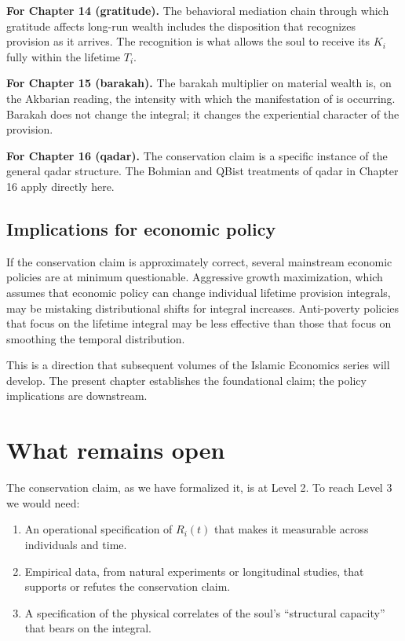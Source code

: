 \textbf{For Chapter 14 (gratitude).} The behavioral mediation chain
through which gratitude affects long-run wealth includes the
disposition that recognizes provision as it arrives. The
recognition is what allows the soul to receive its $K_i$ fully
within the lifetime $T_i$.

\textbf{For Chapter 15 (barakah).} The barakah multiplier on
material wealth is, on the Akbarian reading, the intensity with
which the manifestation of  is occurring. Barakah
does not change the integral; it changes the experiential
character of the provision.

\textbf{For Chapter 16 (qadar).} The conservation claim is a
specific instance of the general qadar structure. The Bohmian and
QBist treatments of qadar in Chapter 16 apply directly here.

\subsection{Implications for economic policy}

If the conservation claim is approximately correct, several
mainstream economic policies are at minimum questionable.
Aggressive growth maximization, which assumes that economic policy
can change individual lifetime provision integrals, may be
mistaking distributional shifts for integral increases.
Anti-poverty policies that focus on the lifetime integral may be
less effective than those that focus on smoothing the temporal
distribution.

This is a direction that subsequent volumes of the Islamic
Economics series will develop. The present chapter establishes the
foundational claim; the policy implications are downstream.

\section{What remains open}
\label{sec:rizq-open}

The conservation claim, as we have formalized it, is at Level 2. To
reach Level 3 we would need:

\begin{enumerate}[leftmargin=2em]
    \item An operational specification of $R_i(t)$ that makes it
    measurable across individuals and time.
    \item Empirical data, from natural experiments or longitudinal
    studies, that supports or refutes the conservation claim.
    \item A specification of the physical correlates of the soul's
    ``structural capacity'' that bears on the integral.
\end{enumerate}

